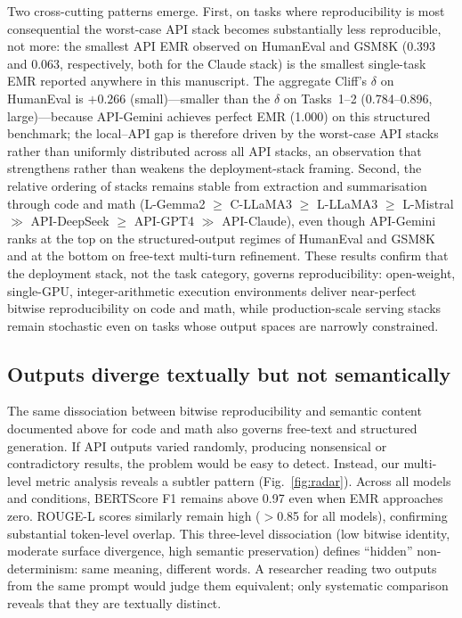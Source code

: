 \documentclass[sn-nature]{sn-jnl}
\begin{document}
Two cross-cutting patterns emerge.
First, on tasks where reproducibility is most consequential the worst-case API stack becomes substantially less reproducible, not more: the smallest API EMR observed on HumanEval and GSM8K (0.393 and 0.063, respectively, both for the Claude stack) is the smallest single-task EMR reported anywhere in this manuscript. The aggregate Cliff's $\delta$ on HumanEval is $+0.266$ (small)---smaller than the $\delta$ on Tasks~1--2 (0.784--0.896, large)---because API-Gemini achieves perfect EMR (1.000) on this structured benchmark; the local--API gap is therefore driven by the worst-case API stacks rather than uniformly distributed across all API stacks, an observation that strengthens rather than weakens the deployment-stack framing.
Second, the relative ordering of stacks remains stable from extraction and summarisation through code and math (L-Gemma2 $\geq$ C-LLaMA3 $\geq$ L-LLaMA3 $\geq$ L-Mistral $\gg$ API-DeepSeek $\geq$ API-GPT4 $\gg$ API-Claude), even though API-Gemini ranks at the top on the structured-output regimes of HumanEval and GSM8K and at the bottom on free-text multi-turn refinement.
These results confirm that the deployment stack, not the task category, governs reproducibility: open-weight, single-GPU, integer-arithmetic execution environments deliver near-perfect bitwise reproducibility on code and math, while production-scale serving stacks remain stochastic even on tasks whose output spaces are narrowly constrained.


\subsection{Outputs diverge textually but not semantically}\label{subsec:semantic}

The same dissociation between bitwise reproducibility and semantic content documented above for code and math also governs free-text and structured generation. If API outputs varied randomly, producing nonsensical or contradictory results, the problem would be easy to detect.
Instead, our multi-level metric analysis reveals a subtler pattern (Fig.~\ref{fig:radar}).
Across all models and conditions, BERTScore F1 remains above 0.97 even when EMR approaches zero.
ROUGE-L scores similarly remain high ($>$0.85 for all models), confirming substantial token-level overlap.
This three-level dissociation (low bitwise identity, moderate surface divergence, high semantic preservation) defines ``hidden'' non-determinism: same meaning, different words.
A researcher reading two outputs from the same prompt would judge them equivalent; only systematic comparison reveals that they are textually distinct.
\end{document}
